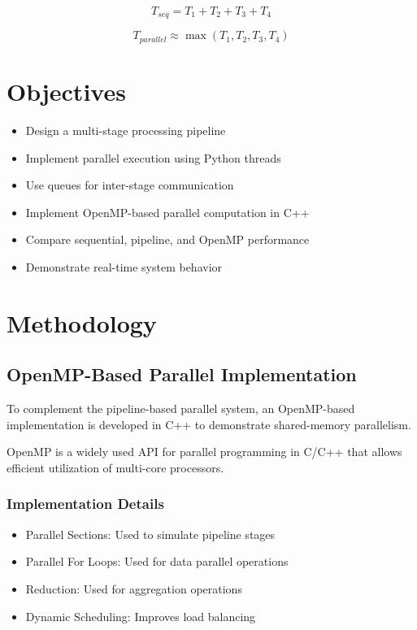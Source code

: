\documentclass[12pt]{report}
\begin{document}
\[
T_{seq} = T_1 + T_2 + T_3 + T_4
\]

\[
T_{parallel} \approx \max(T_1, T_2, T_3, T_4)
\]

\chapter{Objectives}
\begin{itemize}
\item Design a multi-stage processing pipeline
\item Implement parallel execution using Python threads
\item Use queues for inter-stage communication
\item Implement OpenMP-based parallel computation in C++
\item Compare sequential, pipeline, and OpenMP performance
\item Demonstrate real-time system behavior
\end{itemize}

\chapter{Methodology}
\section{OpenMP-Based Parallel Implementation}

To complement the pipeline-based parallel system, an OpenMP-based implementation is developed in C++ to demonstrate shared-memory parallelism.

OpenMP is a widely used API for parallel programming in C/C++ that allows efficient utilization of multi-core processors.

\subsection*{Implementation Details}
\begin{itemize}
\item Parallel Sections: Used to simulate pipeline stages
\item Parallel For Loops: Used for data parallel operations
\item Reduction: Used for aggregation operations
\item Dynamic Scheduling: Improves load balancing
\end{itemize}
\end{document}
